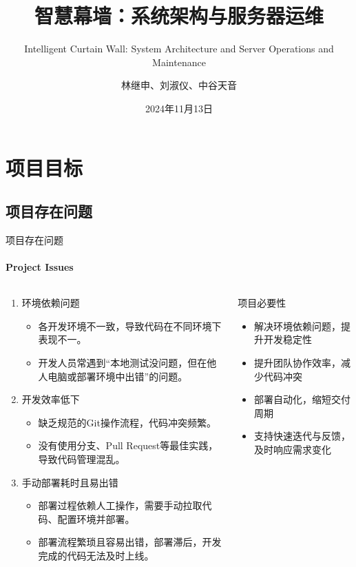 \documentclass{beamer}
\title{智慧幕墙：系统架构与服务器运维}
\subtitle{Intelligent Curtain Wall: System Architecture and Server Operations and Maintenance}
\author{林继申、刘淑仪、中谷天音}
\date{2024年11月13日}
\begin{document}
\maketitle


\section{项目目标}


\subsection{项目存在问题}

\begin{frame}[fragile]{项目存在问题}
\framesubtitle{Project Issues}
\begin{columns}
\begin{column}{0.7\textwidth}
\begin{enumerate}
\item 环境依赖问题
\begin{itemize}
\item 各开发环境不一致，导致代码在不同环境下表现不一。
\item 开发人员常遇到“本地测试没问题，但在他人电脑或部署环境中出错”的问题。
\end{itemize}
\item 开发效率低下
\begin{itemize}
\item 缺乏规范的Git操作流程，代码冲突频繁。
\item 没有使用分支、Pull Request等最佳实践，导致代码管理混乱。
\end{itemize}
\item 手动部署耗时且易出错
\begin{itemize}
\item 部署过程依赖人工操作，需要手动拉取代码、配置环境并部署。
\item 部署流程繁琐且容易出错，部署滞后，开发完成的代码无法及时上线。
\end{itemize}
\end{enumerate}
\end{column}
\begin{column}{0.3\textwidth}
\begin{block}{项目必要性}
\begin{itemize}
\item 解决环境依赖问题，提升开发稳定性
\item 提升团队协作效率，减少代码冲突
\item 部署自动化，缩短交付周期
\item 支持快速迭代与反馈，及时响应需求变化
\end{itemize}
\end{block}
\end{column}
\end{columns}
\end{frame}
\end{document}
